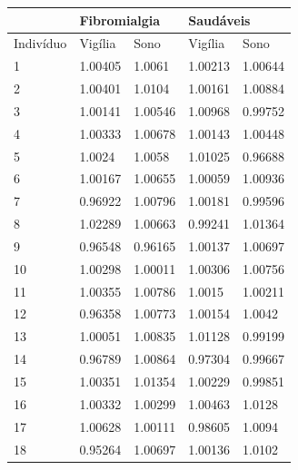 \documentclass{ufscThesis}
\begin{document}
\begin{table}[h]
\centering
\begin{tabular}{|l|l|l|l|l|}
\hline
          & \multicolumn{2}{l|}{Fibromialgia} & \multicolumn{2}{l|}{Saudáveis} \\ \hline
Indivíduo & Vigília         & Sono            & Vigília        & Sono          \\ \hline
1         & 1.00405         & 1.0061          & 1.00213        & 1.00644       \\ \hline
2         & 1.00401         & 1.0104          & 1.00161        & 1.00884       \\ \hline
3         & 1.00141         & 1.00546         & 1.00968        & 0.99752       \\ \hline
4         & 1.00333         & 1.00678         & 1.00143        & 1.00448       \\ \hline
5         & 1.0024          & 1.0058          & 1.01025        & 0.96688       \\ \hline
6         & 1.00167         & 1.00655         & 1.00059        & 1.00936       \\ \hline
7         & 0.96922         & 1.00796         & 1.00181        & 0.99596       \\ \hline
8         & 1.02289         & 1.00663         & 0.99241        & 1.01364       \\ \hline
9         & 0.96548         & 0.96165         & 1.00137        & 1.00697       \\ \hline
10        & 1.00298         & 1.00011         & 1.00306        & 1.00756       \\ \hline
11        & 1.00355         & 1.00786         & 1.0015         & 1.00211       \\ \hline
12        & 0.96358         & 1.00773         & 1.00154        & 1.0042        \\ \hline
13        & 1.00051         & 1.00835         & 1.01128        & 0.99199       \\ \hline
14        & 0.96789         & 1.00864         & 0.97304        & 0.99667       \\ \hline
15        & 1.00351         & 1.01354         & 1.00229        & 0.99851       \\ \hline
16        & 1.00332         & 1.00299         & 1.00463        & 1.0128        \\ \hline
17        & 1.00628         & 1.00111         & 0.98605        & 1.0094        \\ \hline
18        & 0.95264         & 1.00697         & 1.00136        & 1.0102        \\ \hline

\end{tabular}
\end{table}
\end{document}
